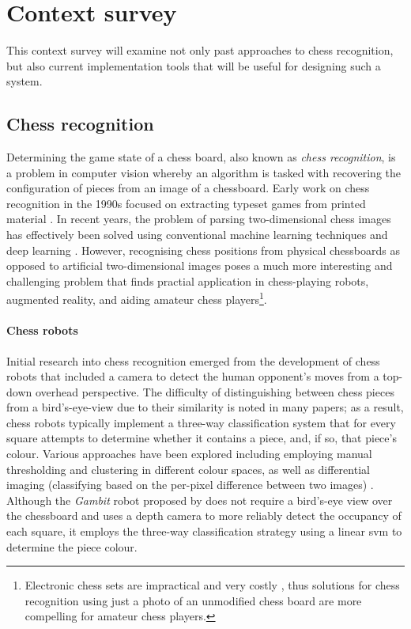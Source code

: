 \section{Context survey}
This context survey will examine not only past approaches to chess recognition, but also current implementation tools that will be useful for designing such a system.

\subsection{Chess recognition}
\label{sec:context_survey_chess_recognition}
Determining the game state of a chess board, also known as \emph{chess recognition}, is a problem in computer vision whereby an algorithm is tasked with recovering the configuration of pieces from an image of a chessboard.
Early work on chess recognition in the 1990s focused on extracting typeset games from printed material \cite{baird1990}. 
In recent years, the problem of parsing two-dimensional chess images has effectively been solved using conventional machine learning techniques \cite{khater2012} and deep learning \cite{sameer2020,roy2020}.
However, recognising chess positions from physical chessboards as opposed to artificial two-dimensional images poses a much more interesting and challenging problem that finds practial application in chess-playing robots, augmented reality, and aiding amateur chess players\footnote{Electronic chess sets are impractical and very costly \cite{wang2013}, thus solutions for chess recognition using just a photo of an unmodified chess board are more compelling for amateur chess players.}.

\paragraph{Chess robots}
Initial research into chess recognition emerged from the development of chess robots that included a camera to detect the human opponent's moves from a top-down overhead perspective. 
The difficulty of distinguishing between chess pieces from a bird's-eye-view due to their similarity is noted in many papers; as a result, chess robots typically implement a three-way classification system that for every square attempts to determine whether it contains a piece, and, if so, that piece's colour.
Various approaches have been explored including
  employing manual thresholding \cite{cour2002,urting2003,banerjee2012,chen2016} and clustering \cite{goncalves2005} in different colour spaces, as well as
  differential imaging (classifying based on the per-pixel difference between two images) \cite{khan2014,chen2019}.
Although the \emph{Gambit} robot proposed by \textcite{matuszek2011} does not require a bird's-eye view over the chessboard and uses a depth camera to more reliably detect the occupancy of each square, it employs the three-way classification strategy using a linear \gls{svm} to determine the piece colour. 

